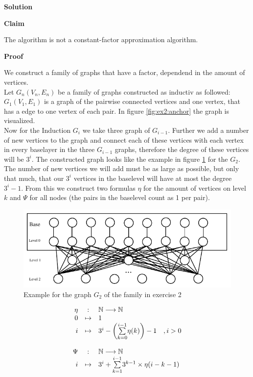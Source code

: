 \documentclass[11pt,a4paper,ngerman]{article}
\newcommand{\claim}{\addtocounter{claims}{1} \bfseries Claim \arabic{claims}}
\newcommand{\proof}{\bfseries Proof}
\begin{document}
\textbf{Solution}\\
\begin{description}
	\item{\claim} The algorithm is not a constant-factor approximation algorithm.
	\item{\proof}


We construct a family of graphs that have a factor, dependend in the amount of vertices.\\
Let $G_n(V_n,E_n)$ be a family of graphs constructed as inductiv as followed:\\
$G_1(V_1,E_1)$ is a graph of the pairwise connected vertices and one vertex, that has a edge to one vertex of each pair. In figure \ref{fig:ex2:anchor} the graph is visualized.\\

Now for the Induction $G_i$ we take three graph of $G_{i-1}$. Further we add a number of new vertices to the graph and connect each of these vertices with each vertex in every baselayer in the three $G_{i-1}$ graphs, therefore the degree of these vertices will be $3^i$. The constructed graph looks like the example in figure \ref{fig:ex2:example} for the $G_2$.\\

The number of new vertices we will add must be as large as possible, but only that much, that our $3^i$ vertices in the baselevel will have at most the degree $3^i - 1$. From this we construct two formulas $\eta$ for the amount of vertices on level $k$ and $\Psi$ for all nodes (the pairs in the baselevel count as 1 per pair).


\begin{figure}[!b]
	\centering
	\includegraphics[width=\textwidth]{ex2_counter}
	\caption{Example for the graph $G_2$ of the family in exercise 2}
	\label{fig:ex2:example}
\end{figure}

$$
\begin{array}{rcl}
\eta & \; : \; & \mathbb{N}  \longrightarrow  \mathbb{N}\\
0 & \mapsto & 1\\
i & \mapsto & 3^i - \left( \underset{k=0}{\overset{i-1}{\sum}} \eta (k) \right) - 1 \quad , i>0 
\vspace{12pt}\\
\Psi & \; : \;&  \mathbb{N} \longrightarrow \mathbb{N}\\
i & \mapsto & 3^i + \underset{k=1}{\overset{i-1}{\sum}} 3^{k-1} \times \eta (i - k - 1)
\end{array}
$$


\end{description}
\end{document}
